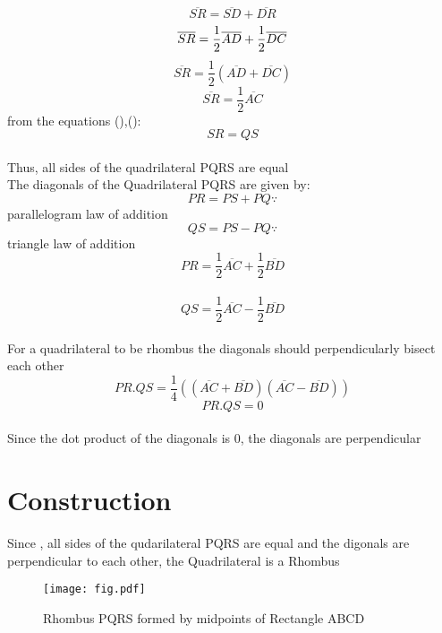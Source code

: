 \documentclass[journal,10pt,twocolumn]{article}
\begin{document}
\begin{equation}
	\overline{SR}= \overline{SD} + \overline{DR} 
\end{equation}
\begin{equation}
		  \overline{SR}  = \frac{1}{2}\overline{AD} + \frac{1}{2}\overline{DC} \\
\end{equation}
\begin{equation}
	\overline{SR} = \frac{1}{2}(\overline{AD}+\overline{DC})
\end{equation}
\begin{equation}
	\overline{SR} = \frac{1}{2}\overline{AC}
\end{equation}
from the equations (),():
\begin{equation}
	SR = QS
\end{equation}
\\ Thus, all sides of the quadrilateral PQRS are equal
\\ The diagonals of the Quadrilateral PQRS are given by:
\begin{equation}
	PR = PS+PQ
	\because
\end{equation}
parallelogram law of addition
\begin{equation}
	QS = PS-PQ
	\because
\end{equation}
triangle law of addition
\\ \begin{equation}
	PR = \frac{1}{2}\overline{AC}+\frac{1}{2}\overline{BD}
\end{equation}
\\ \begin{equation}
        QS = \frac{1}{2}\overline{AC}-\frac{1}{2}\overline{BD}
\end{equation}
\\ For a quadrilateral to be rhombus the diagonals should perpendicularly bisect each other
\begin{equation}
	PR.QS = \frac{1}{4}((\overline{AC}+\overline{BD})(\overline{AC}-\overline{BD}))
\end{equation}
\begin{equation}
	PR.QS = 0
\end{equation}
\\Since the dot product of the diagonals is 0, the diagonals are perpendicular
\section*{Construction}
Since , all sides of the qudarilateral PQRS are equal and the digonals are perpendicular to each other, the Quadrilateral is a Rhombus
\begin{figure}[h]
\texttt{[image: fig.pdf]}
\caption{Rhombus PQRS formed by midpoints of Rectangle ABCD}
\end{figure}
\end{document}
